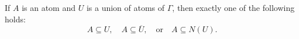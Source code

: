If $A$ is an atom and $U$ is a union of atoms of $\Gamma$, then exactly one of the following holds:
$$A \subseteq U, \quad A \subseteq \overline{U}, \quad \text{or} \quad A \subseteq N(U).$$
